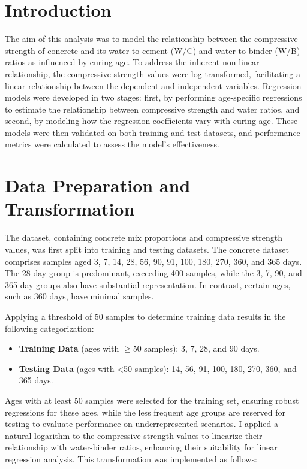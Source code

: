 \documentclass[a4paper,11pt]{article}
\begin{document}
\section*{Introduction}
The aim of this analysis was to model the relationship between the compressive strength of concrete and its water-to-cement (W/C) and water-to-binder (W/B) ratios as influenced by curing age. To address the inherent non-linear relationship, the compressive strength values were log-transformed, facilitating a linear relationship between the dependent and independent variables. Regression models were developed in two stages: first, by performing age-specific regressions to estimate the relationship between compressive strength and water ratios, and second, by modeling how the regression coefficients vary with curing age. These models were then validated on both training and test datasets, and performance metrics were calculated to assess the model’s effectiveness.

\section*{Data Preparation and Transformation}
The dataset, containing concrete mix proportions and compressive strength values, was first split into training and testing datasets. The concrete dataset comprises samples aged 3, 7, 14, 28, 56, 90, 91, 100, 180, 270, 360, and 365 days. The 28-day group is predominant, exceeding 400 samples, while the 3, 7, 90, and 365-day groups also have substantial representation. In contrast, certain ages, such as 360 days, have minimal samples.

Applying a threshold of 50 samples to determine training data results in the following categorization:

\begin{itemize}
    \item \textbf{Training Data} (ages with $\geq$50 samples): 3, 7, 28, and 90 days.
    \item \textbf{Testing Data} (ages with <50 samples): 14, 56, 91, 100, 180, 270, 360, and 365 days.
\end{itemize}


Ages with at least 50 samples were selected for the training set, ensuring robust regressions for these ages, while the less frequent age groups are reserved for testing to evaluate performance on underrepresented scenarios.
I applied a natural logarithm to the compressive strength values to linearize their relationship with water-binder ratios, enhancing their suitability for linear regression analysis. This transformation was implemented as follows:
\end{document}
